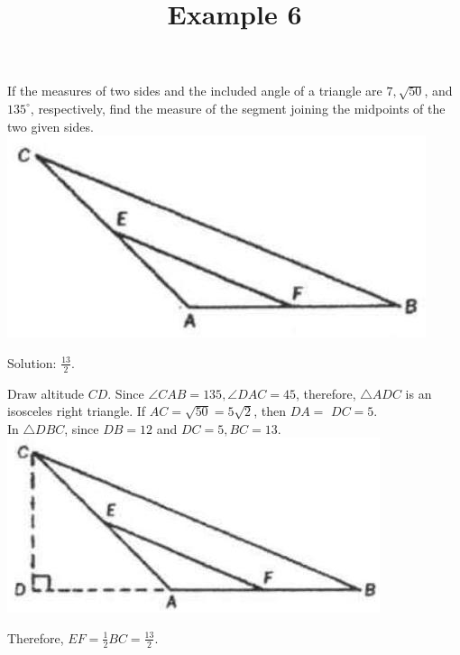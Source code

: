 \documentclass{article}
\title{Example 6}
\date{}
\begin{document}
\maketitle

If the measures of two sides and the included angle of a triangle are \(7, \sqrt{50}\), and \(135^{\circ}\), respectively, find the measure of the segment joining the midpoints of the two given sides.\\
\centering
\includegraphics[width=\textwidth]{images/problem_image_1.jpg}

Solution: \(\frac{13}{2}\).


Draw altitude \(C D\). Since \(\angle C A B=135, \angle D A C=45\), therefore, \(\triangle A D C\) is an isosceles right triangle. If \(A C=\sqrt{50}=5 \sqrt{2}\), then \(D A=\) \(D C=5\).\\
In \(\triangle D B C\), since \(D B=12\) and \(D C=5, B C=13\).\\
\centering
\includegraphics[width=\textwidth]{images/reasoning_image_1.jpg}

Therefore, \(E F=\frac{1}{2} B C=\frac{13}{2}\).
\end{document}
